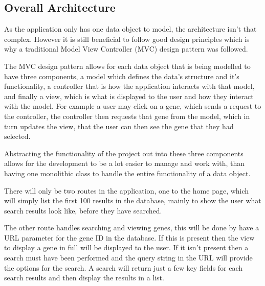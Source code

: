  


\subsection{Overall Architecture}
As the application only has one data object to model, the architecture isn't that complex. However it is still beneficial to follow good design principles which is why a traditional Model View Controller (MVC) design pattern was followed. 

The MVC design pattern allows for each data object that is being modelled to have three components, a model which defines the data's structure and it's functionality, a controller that is how the application interacts with that model, and finally a view, which is what is displayed to the user and how they interact with the model. For example a user may click on a gene, which sends a request to the controller, the controller then requests that gene from the model, which in turn updates the view, that the user can then see the gene that they had selected. 

Abstracting the functionality of the project out into these three components allows for the development to be a lot easier to manage and work with, than having one monolithic class to handle the entire functionality of a data object. 

There will only be two routes in the application, one to the home page, which will simply list the first 100 results in the database, mainly to show the user what search results look like, before they have searched. 

The other route handles searching and viewing genes, this will be done by have a URL parameter for the gene ID in the database. If this is present then the view to display a gene in full will be displayed to the user. If it isn't present then a search must have been performed and the query string in the URL will provide the options for the search. A search will return just a few key fields for each search results and then display the results in a list.   

